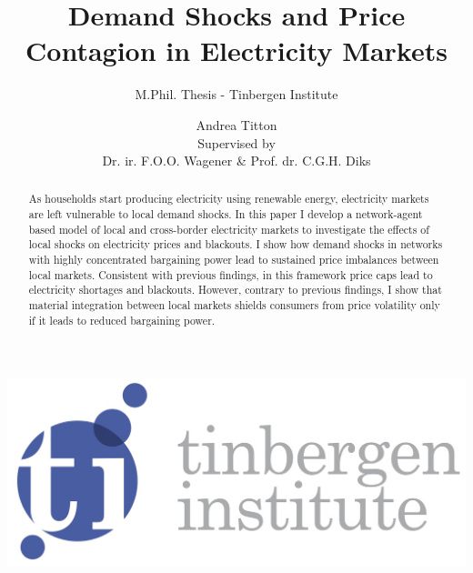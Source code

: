 \documentclass[american, abstract=on]{scrartcl}
\author{Andrea Titton \\[0.5cm]{\large Supervised by \\ Dr. ir. F.O.O. Wagener \& Prof. dr. C.G.H. Diks}}
\title{Demand Shocks and Price Contagion in Electricity Markets}
\subtitle{M.Phil. Thesis - Tinbergen Institute}
\begin{document}
\makeatletter
\begin{titlepage}
    \begin{center}
        \includegraphics[width=0.7\linewidth]{ti_logoblok.jpg}\\[12ex]
        {\huge \bfseries  \@title }\\[4ex]
        {\large \bfseries \@subtitle}\\[8ex]
        {\LARGE  \@author}\\[50ex]
        {\large \@date}
    \end{center}
\end{titlepage}
\makeatother

\thispagestyle{empty}
\newpage

\setcounter{page}{1}

\begin{abstract} \noindent
    As households start producing electricity using renewable energy, electricity markets are left vulnerable to local demand shocks. In this paper I develop a network-agent based model of local and cross-border electricity markets to investigate the effects of local shocks on electricity prices and blackouts. I show how demand shocks in networks with highly concentrated bargaining power lead to sustained price imbalances between local markets. Consistent with previous findings, in this framework price caps lead to electricity shortages and blackouts. However, contrary to previous findings, I show that material integration between local markets shields consumers from price volatility only if it leads to reduced bargaining power.
\end{abstract}














\newpage
\printbibliography
{} %
\newpage
\appendix


\end{document}
